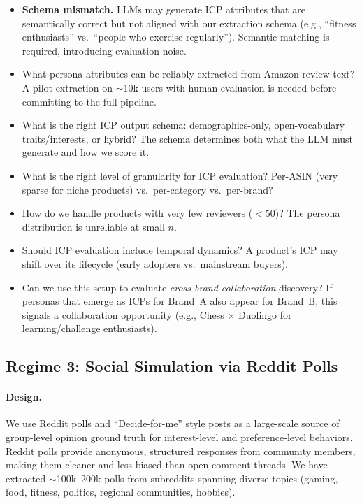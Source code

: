 \begin{itemize}
    \item \textbf{Schema mismatch.} LLMs may generate ICP attributes that are semantically correct but not aligned with our extraction schema (e.g., ``fitness enthusiasts'' vs.\ ``people who exercise regularly''). Semantic matching is required, introducing evaluation noise.
    \item What persona attributes can be reliably extracted from Amazon review text? A pilot extraction on ${\sim}$10k users with human evaluation is needed before committing to the full pipeline.
    \item What is the right ICP output schema: demographics-only, open-vocabulary traits/interests, or hybrid? The schema determines both what the LLM must generate and how we score it.
    \item What is the right level of granularity for ICP evaluation? Per-ASIN (very sparse for niche products) vs.\ per-category vs.\ per-brand?
    \item How do we handle products with very few reviewers ($<50$)? The persona distribution is unreliable at small $n$.
    \item Should ICP evaluation include temporal dynamics? A product's ICP may shift over its lifecycle (early adopters vs.\ mainstream buyers).
    \item Can we use this setup to evaluate \emph{cross-brand collaboration} discovery? If personas that emerge as ICPs for Brand~A also appear for Brand~B, this signals a collaboration opportunity (e.g., Chess $\times$ Duolingo for learning/challenge enthusiasts).
\end{itemize}


\subsection{Regime 3: Social Simulation via Reddit Polls}
\label{sec:eval-reddit-polls}

\paragraph{Design.}
We use Reddit polls and ``Decide-for-me'' style posts as a large-scale source of group-level opinion ground truth for interest-level and preference-level behaviors.
Reddit polls provide anonymous, structured responses from community members, making them cleaner and less biased than open comment threads.
We have extracted ${\sim}$100k--200k polls from subreddits spanning diverse topics (gaming, food, fitness, politics, regional communities, hobbies).

